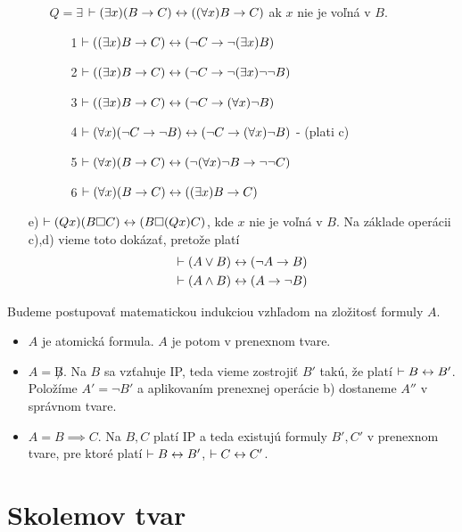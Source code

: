 \begin{dokaz}
\begin{itemize}
\begin{itemize}
        \item[$Q=\exists$]
            $\vdash (\exists x) (B \rightarrow C) \leftrightarrow
             ((\forall x) B \rightarrow C)$ ak $x$ nie je voľná v $B$.
            \begin{itemize}
            \item[1]
                $\vdash ((\exists x) B \rightarrow C) \leftrightarrow
                    (\neg C \rightarrow \neg (\exists x) B)$
            \item[2]
                $\vdash ((\exists x) B \rightarrow C) \leftrightarrow
                    (\neg C \rightarrow \neg (\exists x) \neg \neg B)$
            \item[3]
                $\vdash ((\exists x) B \rightarrow C) \leftrightarrow
                (\neg C \rightarrow (\forall x) \neg B)$
            \item[4]
                $\vdash (\forall x) (\neg C \rightarrow \neg B)
                \leftrightarrow
                    (\neg C \rightarrow (\forall x) \neg B)$ - (plati c)
            \item[5]
                $\vdash (\forall x) (B \rightarrow C) \leftrightarrow
                    (\neg (\forall x) \neg B \rightarrow \neg \neg C)$
            \item[6]
                $\vdash (\forall x) (B \rightarrow C) \leftrightarrow
                    ((\exists x) B \rightarrow C)$
            \end{itemize}
        \end{itemize}
        \item[e)]
            $\vdash (Qx) (B\square C) \leftrightarrow (B\square (Qx)C)$,
            kde $x$ nie je voľná v $B$.
            Na základe operácii c),d) vieme toto dokázať, pretože platí
            \begin{align*}
                \vdash (A \lor B) \leftrightarrow (\neg A \rightarrow B) \\
                \vdash (A \land B) \leftrightarrow (A \rightarrow \neg B)
            \end{align*}
  \end{itemize}
\end{dokaz}

\begin{dokaz}
Budeme postupovať matematickou indukciou vzhľadom na zložitosť formuly $A$.
\begin{itemize}
    \item $A$ je atomická formula. $A$ je potom v prenexnom tvare.
    \item $A=\not B$. Na $B$ sa vzťahuje IP, teda vieme zostrojiť
        $B'$ takú, že platí
        $\vdash B \leftrightarrow B'$.
        Položíme $A'=\neg B'$ a aplikovaním prenexnej operácie b) dostaneme 
        $A''$ v správnom tvare.
    \item $A=B \implies C$. Na $B,C$ platí IP a teda existujú formuly
        $B',C'$ v prenexnom tvare, pre ktoré platí
        $\vdash B \leftrightarrow B'$, $\vdash C \leftrightarrow C'$.
\end{itemize}
\end{dokaz}

\section{Skolemov tvar}
\todo{}
